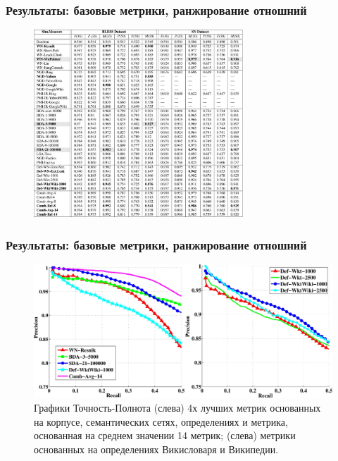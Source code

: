\begin{frame}
\frametitle{Результаты: базовые метрики, ранжирование отношний}

    \begin{figure}
    \centering
        \includegraphics[width=0.7\textwidth]{figures/sr}
        
\end{figure}
    
\end{frame}




\begin{frame}
\frametitle{Результаты: базовые метрики, ранжирование отношний}

    \begin{figure}
    \centering
        \includegraphics[width=1.0\textwidth]{../figures/pr-plots-2}
            \caption{Графики Точность-Полнота (слева) 4х лучших метрик основанных на корпусе, семантических сетях, определениях и метрика, основанная на среднем значении 14 метрик; (слева) метрики основанных на определениях Викисловаря и Википедии. }
\end{figure}
    
\end{frame}







